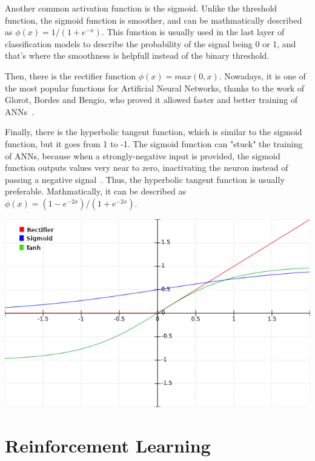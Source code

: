 Another common activation function is the sigmoid. Unlike the threshold function, the sigmoid function is smoother, and can be mathmatically described as $\phi(x) = 1/(1+e^{-x})$. This function is usually used in the last layer of classification models to describe the probability of the signal being 0 or 1, and that's where the smoothness is helpfull instead of the binary threshold.

Then, there is the rectifier function $\phi(x) = max(0, x)$. Nowadays, it is one of the most popular functions for Artificial Neural Networks, thanks to the work of Glorot, Bordes and Bengio, who proved it allowed faster and better training of ANNs~\cite{Glorot2010}.

Finally, there is the hyperbolic tangent function, which is similar to the sigmoid function, but it goes from 1 to -1. The sigmoid function can "stuck" the training of ANNs, because when a strongly-negative input is provided, the sigmoid function outputs values very near to zero, inactivating the neuron instead of passing a negative signal~\cite{Glorot2010.2}. Thus, the hyperbolic tangent function is usually preferable. Mathmatically, it can be described as $\phi(x) = (1-e^{-2x})/(1+e^{-2x})$.

\vspace{0.5cm}

\includegraphics[width=1\columnwidth]{activation-functions}



\section{Reinforcement Learning}
\label{sec:reinforcement-learning}


